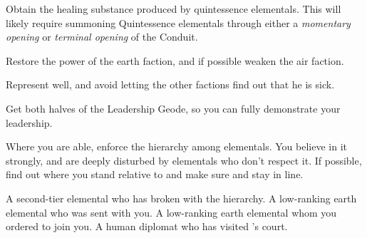 \documentclass[char]{elementals}
\begin{document}
\begin{itemz}[Goals]
	\item Obtain the healing substance produced by quintessence elementals. This will likely require summoning Quintessence elementals through either a \emph{momentary opening} or \emph{terminal opening} of the Conduit.
	\item Restore the power of the earth faction, and if possible weaken the air faction.
	\item Represent \cEarthKing{} well, and avoid letting the other factions find out that he is sick.
        \item Get both halves of the Leadership Geode, so you can fully demonstrate your leadership.
	\item Where you are able, enforce the hierarchy among elementals.  You believe in it strongly, and are deeply disturbed by elementals who don't respect it.  If possible, find out where you stand relative to \cRogue{} and make sure \cMinion{} and \cMiniEarth{} stay in line.
\end{itemz}
 
\begin{contacts}
	\contact{\cRogue{}}  A second-tier elemental who has broken with the hierarchy.
	\contact{\cMinion{}}  A low-ranking earth elemental who was sent with you. 
  \contact{\cMiniEarth{}}  A low-ranking earth elemental whom you ordered to join you.
  \contact{\cAvatar{}}  A human diplomat who has visited \cEarthKing{}'s court.
\end{contacts} 
\end{document}
